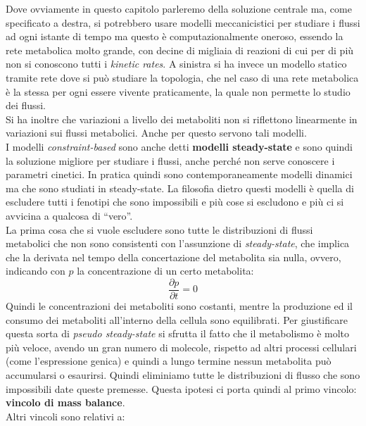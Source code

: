 \documentclass[a4paper,12pt, oneside]{book}
\begin{document}
Dove ovviamente in questo capitolo parleremo della soluzione centrale ma, come
specificato a destra, si potrebbero usare modelli meccanicistici per studiare i
flussi ad ogni istante di tempo ma questo è computazionalmente oneroso, essendo
la rete metabolica molto grande, con decine di migliaia di reazioni di cui per
di più non si conoscono tutti i \textit{kinetic rates}. A sinistra si ha invece
un modello statico tramite rete dove si può studiare la topologia, che nel caso
di una rete metabolica è la stessa per ogni essere vivente praticamente, la
quale non permette lo studio dei flussi.\\
Si ha inoltre che variazioni a livello dei metaboliti non si riflettono
linearmente in variazioni sui flussi metabolici. Anche per questo servono tali
modelli.\\
I modelli \textit{constraint-based} sono anche detti \textbf{modelli
  steady-state} e sono quindi la soluzione migliore per studiare i flussi, anche
perché non serve conoscere i parametri cinetici. In pratica quindi sono
contemporaneamente modelli dinamici ma che sono studiati in steady-state.
La filosofia dietro questi modelli è quella di escludere tutti i fenotipi che
sono impossibili e più cose si escludono e più ci si avvicina a qualcosa di
``vero''.\\
La prima cosa che si vuole escludere sono tutte le distribuzioni di flussi
metabolici che non sono consistenti con l'assunzione di \textit{steady-state},
che implica che la derivata nel tempo della concertazione del metabolita sia
nulla, 
ovvero, indicando con $p$ la concentrazione di un certo metabolita:
\[\frac{\partial p}{\partial t}=0\]
Quindi le concentrazioni dei metaboliti sono costanti, mentre la produzione ed
il consumo dei metaboliti all'interno della cellula sono equilibrati. 
Per giustificare questa sorta di \textit{pseudo steady-state} si sfrutta il
fatto che il metabolismo è molto più veloce, avendo un gran numero di molecole,
rispetto ad altri processi cellulari 
(come l'espressione genica) e quindi a lungo termine nessun metabolita può
accumularsi o esaurirsi. Quindi eliminiamo tutte le distribuzioni di flusso che
sono impossibili date queste premesse.
Questa ipotesi ci porta quindi al primo vincolo: \textbf{vincolo di mass
  balance}.\\ 
Altri vincoli sono relativi a:
\end{document}
